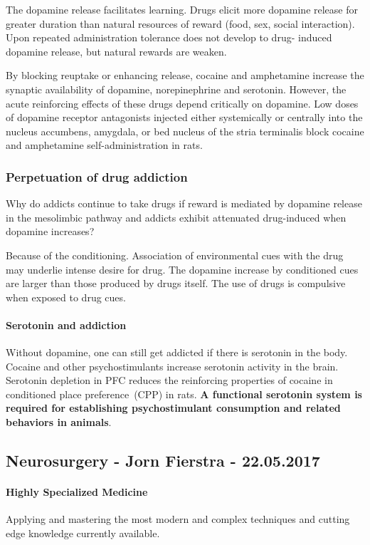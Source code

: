 \documentclass[12pt,article,oneside,a4paper]{memoir}
\begin{document}
The dopamine release facilitates learning. Drugs elicit more dopamine release
for greater duration than natural resources of reward (food, sex, social
interaction). Upon repeated administration tolerance does not develop to drug-
induced dopamine release, but natural rewards are weaken.

By blocking reuptake or enhancing release, cocaine and amphetamine increase
the synaptic availability of dopamine, norepinephrine and serotonin. However,
the acute reinforcing effects of these drugs depend critically on dopamine.
Low doses of dopamine receptor antagonists injected either systemically or
centrally into the nucleus accumbens, amygdala, or bed nucleus of the stria
terminalis block cocaine and amphetamine self-administration in rats.

\subsubsection{Perpetuation of drug addiction}
Why do addicts continue to take drugs if reward is mediated by dopamine release
in the mesolimbic pathway and addicts exhibit attenuated drug-induced when
dopamine increases?

Because of the conditioning. Association of environmental cues with the drug
may underlie intense desire for drug. The dopamine increase by conditioned cues
are larger than those produced by drugs itself. The use of drugs is compulsive
when exposed to drug cues.

\paragraph{Serotonin and addiction}
Without dopamine, one can still get addicted if there is serotonin in the body.
Cocaine and other psychostimulants increase serotonin activity in the brain.
Serotonin depletion in PFC reduces the reinforcing properties of cocaine in
conditioned place preference~(CPP) in rats. \textbf{A functional serotonin
system is required for establishing psychostimulant consumption and related
behaviors in animals}.

\newpage
\subsection{Neurosurgery - Jorn Fierstra - 22.05.2017}
\paragraph{Highly Specialized Medicine}
Applying and mastering the most modern and complex techniques and cutting edge
knowledge currently available.
\end{document}
